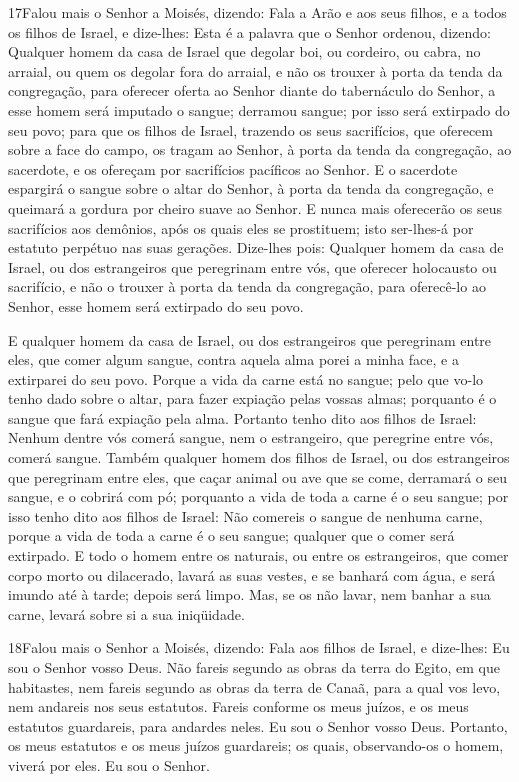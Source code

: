 \lettrine{17} Falou mais o Senhor a Moisés, dizendo: Fala
a Arão e aos seus filhos, e a todos os filhos de Israel, e
dize-lhes: Esta é a palavra que o Senhor ordenou, dizendo:
Qualquer homem da casa de Israel que degolar boi, ou cordeiro,
ou cabra, no arraial, ou quem os degolar fora do arraial, e não
os trouxer à porta da tenda da congregação, para oferecer oferta ao
Senhor diante do tabernáculo do Senhor, a esse homem será imputado o
sangue; derramou sangue; por isso será extirpado do seu povo;
para que os filhos de Israel, trazendo os seus sacrifícios, que
oferecem sobre a face do campo, os tragam ao Senhor, à porta da
tenda da congregação, ao sacerdote, e os ofereçam por sacrifícios
pacíficos ao Senhor. E o sacerdote espargirá o sangue sobre o
altar do Senhor, à porta da tenda da congregação, e queimará a
gordura por cheiro suave ao Senhor. E nunca mais oferecerão os
seus sacrifícios aos demônios, após os quais eles se prostituem;
isto ser-lhes-á por estatuto perpétuo nas suas gerações.
Dize-lhes pois: Qualquer homem da casa de Israel, ou dos
estrangeiros que peregrinam entre vós, que oferecer holocausto ou
sacrifício, e não o trouxer à porta da tenda da congregação,
para oferecê-lo ao Senhor, esse homem será extirpado do seu povo.

E qualquer homem da casa de Israel, ou dos estrangeiros que
peregrinam entre eles, que comer algum sangue, contra aquela alma
porei a minha face, e a extirparei do seu povo. Porque a vida
da carne está no sangue; pelo que vo-lo tenho dado sobre o altar,
para fazer expiação pelas vossas almas; porquanto é o sangue que
fará expiação pela alma. Portanto tenho dito aos filhos de
Israel: Nenhum dentre vós comerá sangue, nem o estrangeiro, que
peregrine entre vós, comerá sangue. Também qualquer homem dos
filhos de Israel, ou dos estrangeiros que peregrinam entre eles, que
caçar animal ou ave que se come, derramará o seu sangue, e o cobrirá
com pó; porquanto a vida de toda a carne é o seu sangue; por
isso tenho dito aos filhos de Israel: Não comereis o sangue de
nenhuma carne, porque a vida de toda a carne é o seu sangue;
qualquer que o comer será extirpado. E todo o homem entre os
naturais, ou entre os estrangeiros, que comer corpo morto ou
dilacerado, lavará as suas vestes, e se banhará com água, e será
imundo até à tarde; depois será limpo. Mas, se os não lavar,
nem banhar a sua carne, levará sobre si a sua iniqüidade.

\medskip

\lettrine{18} Falou mais o Senhor a Moisés, dizendo: Fala
aos filhos de Israel, e dize-lhes: Eu sou o Senhor vosso Deus.
Não fareis segundo as obras da terra do Egito, em que
habitastes, nem fareis segundo as obras da terra de Canaã, para a
qual vos levo, nem andareis nos seus estatutos. Fareis conforme
os meus juízos, e os meus estatutos guardareis, para andardes neles.
Eu sou o Senhor vosso Deus. Portanto, os meus estatutos e os
meus juízos guardareis; os quais, observando-os o homem, viverá por
eles. Eu sou o Senhor.

